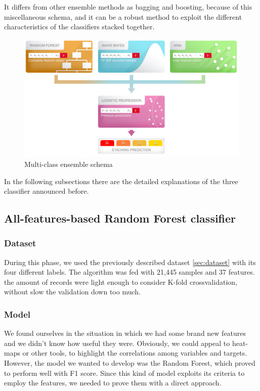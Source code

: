 It differs from other ensemble methods as bagging and boosting, because of this miscellaneous schema, and it can be a robust method to exploit the different characteristics of the classifiers stacked together.

\begin{figure}[htp!]
	\centering
	\includegraphics[width=\columnwidth]{chapter5/figure/stacking.png}
	\caption{Multi-class ensemble schema}
	\label{fig:stacking_schema}
\end{figure}
In the following subsections there are the detailed explanations of the three classifier announced before.

\subsection{All-features-based Random Forest classifier}
\subsubsection{Dataset}
During this phase, we used the previously described dataset \ref{sec:dataset} with its four different labels.
The algorithm was fed with 21,445 samples and 37 features. the amount of records were light enough to consider K-fold crossvalidation, without slow the validation down too much.
\subsubsection{Model}
We found ourselves in the situation in which we had some brand new features and we didn't know how useful they were. Obviously, we could appeal to heat-maps or other tools, to highlight the correlations among variables and targets.
However, the model we wanted to develop was the Random Forest, which proved to perform well with F1 score. Since this kind of model exploits its criteria to employ the features, we needed to prove them with a direct approach.

